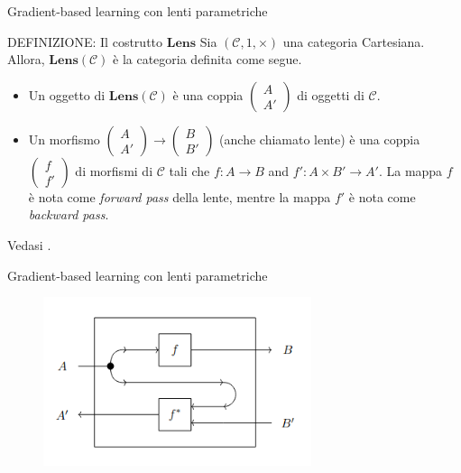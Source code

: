 \documentclass{beamer}
\begin{document}
\begin{frame}{Gradient-based learning con lenti parametriche}
    \begin{block}{DEFINIZIONE: Il costrutto $\mathbf{Lens}$}
        Sia $(\mathcal{C},1,\times)$ una categoria Cartesiana. Allora, $\mathbf{Lens}(\mathcal{C})$ è la categoria definita come segue.
        \begin{itemize}
          \item Un oggetto di $\mathbf{Lens}(\mathcal{C})$ è una coppia $\left(\begin{smallmatrix} A \\ A' \end{smallmatrix}\right)$ di oggetti di $\mathcal{C}$.
          
          \item Un morfismo $\left(\begin{smallmatrix} A \\ A' \end{smallmatrix}\right) \to \left(\begin{smallmatrix} B \\ B' \end{smallmatrix}\right)$ (anche chiamato lente) è una coppia $\left(\begin{smallmatrix} f \\ f' \end{smallmatrix}\right)$ di morfismi di $\mathcal{C}$ tali che $f: A \to B$ and $f': A \times B' \to A'$. La mappa $f$ è nota come \textit{forward pass} della lente, mentre la mappa $f'$ è nota come \textit{backward pass}.
        \end{itemize}
        Vedasi \cite{cruttwell2022categorical}.
      \end{block}
\end{frame}

\begin{frame}{Gradient-based learning con lenti parametriche}
    \begin{figure}
        \begin{center}
            \includegraphics[width=0.7\textwidth]{figures/lens_inner_view.png}
            \caption*{\cite{cruttwell2022categorical}}
        \end{center}
    \end{figure}
\end{frame}
\end{document}
